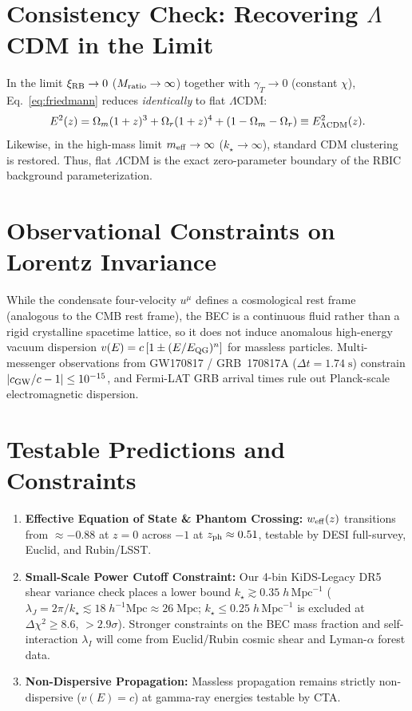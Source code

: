 \documentclass[preprint,12pt]{elsarticle}
\begin{document}
\section*{Consistency Check: Recovering $\Lambda$CDM in the Limit}
\label{sec:limit}

In the limit $\xi_{\rm RB} \to 0$ ($M_{\rm ratio} \to \infty$) together with $\gamma_T \to 0$ (constant $\chi$), Eq.~\eqref{eq:friedmann} reduces \emph{identically} to flat $\Lambda$CDM:
\begin{equation}
    E^2(z) = \Omega_m (1+z)^3 + \Omega_r (1+z)^4 + (1-\Omega_m-\Omega_r) \equiv E_{\Lambda\rm CDM}^2(z).
    \label{eq:lcdm_limit}
\end{equation}
Likewise, in the high-mass limit $m_{\rm eff} \to \infty$ ($k_\star \to \infty$), standard CDM clustering is restored. Thus, flat $\Lambda$CDM is the exact zero-parameter boundary of the RBIC background parameterization.

\section{Observational Constraints on Lorentz Invariance}
\label{sec:constraints}

While the condensate four-velocity $u^\mu$ defines a cosmological rest frame (analogous to the CMB rest frame), the BEC is a continuous fluid rather than a rigid crystalline spacetime lattice, so it does not induce anomalous high-energy vacuum dispersion $v(E) = c\,[1 \pm (E/E_{\rm QG})^n]$ for massless particles. Multi-messenger observations from GW170817 / GRB~170817A ($\Delta t = 1.74\;\mathrm{s}$) \cite{GW170817_2017, Monitor2017} constrain $|c_{\rm GW}/c - 1| \le 10^{-15}$, and Fermi-LAT GRB arrival times \cite{FermiLAT2009} rule out Planck-scale electromagnetic dispersion.

\section{Testable Predictions and Constraints}
\label{sec:predictions}

\begin{enumerate}
    \item \textbf{Effective Equation of State \& Phantom Crossing:} $w_{\rm eff}(z)$ transitions from $\approx -0.88$ at $z=0$ across $-1$ at $z_{\rm ph} \approx 0.51$, testable by DESI full-survey, Euclid, and Rubin/LSST.
    \item \textbf{Small-Scale Power Cutoff Constraint:} Our 4-bin KiDS-Legacy DR5 shear variance check places a lower bound $k_\star \gtrsim 0.35\;h\,\mathrm{Mpc}^{-1}$ ($\lambda_J = 2\pi/k_\star \lesssim 18\;h^{-1}\mathrm{Mpc} \approx 26\;\mathrm{Mpc}$; $k_\star \le 0.25\;h\,\mathrm{Mpc}^{-1}$ is excluded at $\Delta\chi^2 \ge 8.6$, $>2.9\sigma$). Stronger constraints on the BEC mass fraction and self-interaction $\lambda_I$ will come from Euclid/Rubin cosmic shear and Lyman-$\alpha$ forest data.
    \item \textbf{Non-Dispersive Propagation:} Massless propagation remains strictly non-dispersive ($v(E)=c$) at gamma-ray energies testable by CTA.
\end{enumerate}
\end{document}
